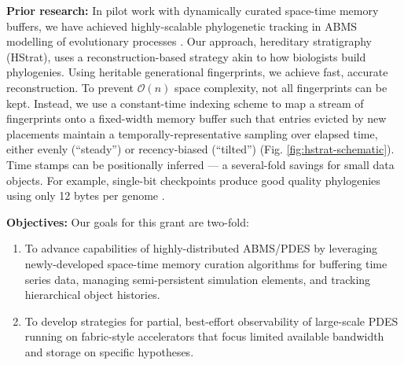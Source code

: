 \vspace{.5em}
\noindent\textbf{Prior research:}
In pilot work with dynamically curated space-time memory buffers, we have achieved highly-scalable phylogenetic tracking in ABMS modelling of evolutionary processes \citep{morenoHstratPythonPackage2022, morenoHereditaryStratigraphyGenome2022}.
Our approach, hereditary stratigraphy (HStrat), uses a reconstruction-based strategy akin to how biologists build phylogenies.
Using heritable generational fingerprints, we achieve fast, accurate reconstruction.
To prevent $\mathcal{O}(n)$ space complexity, not all fingerprints can be kept.
Instead, we use a constant-time indexing scheme to map a stream of fingerprints onto a fixed-width memory buffer such that entries evicted by new placements maintain a temporally-representative sampling over elapsed time, either evenly (``steady'') or recency-biased (``tilted'') (Fig. \ref{fig:hstrat-schematic}).
Time stamps can be positionally inferred  --- a several-fold savings for small data objects. For example, single-bit checkpoints produce good quality phylogenies using only 12 bytes per genome \citep{moreno2023toward}.




\vspace{.5em}
\noindent\textbf{Objectives:} Our goals for this grant are two-fold:
\begin{enumerate}%
\item To advance capabilities of highly-distributed ABMS/PDES by leveraging newly-developed space-time memory curation algorithms for buffering time series data, managing semi-persistent simulation elements, and tracking hierarchical object histories.%
\item To develop strategies for partial, best-effort observability of large-scale PDES running on fabric-style accelerators that focus limited available bandwidth and storage on specific hypotheses.
\end{enumerate}


